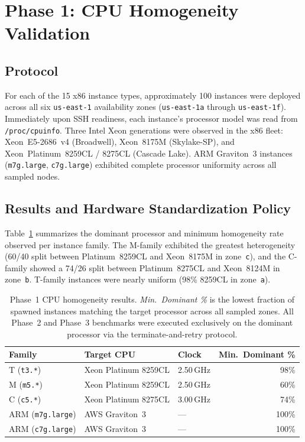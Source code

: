 \documentclass[conference]{IEEEtran}
\begin{document}
\section{Phase 1: CPU Homogeneity Validation}
\label{app:phase1}

\subsection{Protocol}

For each of the 15 x86 instance types, approximately 100 instances were deployed
across all six \texttt{us-east-1} availability zones (\texttt{us-east-1a}
through \texttt{us-east-1f}). Immediately upon SSH readiness, each instance's
processor model was read from \texttt{/proc/cpuinfo}. Three Intel Xeon
generations were observed in the x86 fleet: Xeon~E5-2686~v4 (Broadwell),
Xeon~8175M (Skylake-SP), and Xeon~Platinum~8259CL / 8275CL (Cascade Lake).
ARM Graviton~3 instances (\texttt{m7g.large}, \texttt{c7g.large}) exhibited
complete processor uniformity across all sampled nodes.

\subsection{Results and Hardware Standardization Policy}

Table~\ref{tab:app_cpu_homogeneity} summarizes the dominant processor and
minimum homogeneity rate observed per instance family. The M-family exhibited
the greatest heterogeneity (60/40 split between Platinum~8259CL and Xeon~8175M
in zone~\texttt{c}), and the C-family showed a 74/26 split between
Platinum~8275CL and Xeon~8124M in zone~\texttt{b}. T-family instances were
nearly uniform (98\% 8259CL in zone~\texttt{a}).

\begin{table}[!htbp]
\centering
\caption{Phase~1 CPU homogeneity results. \emph{Min.\ Dominant \%} is the
lowest fraction of spawned instances matching the target processor across all
sampled zones. All Phase~2 and Phase~3 benchmarks were executed exclusively on
the dominant processor via the terminate-and-retry protocol.}
\label{tab:app_cpu_homogeneity}
\small
\begin{tabular}{lllr}
\toprule
\textbf{Family} & \textbf{Target CPU} & \textbf{Clock} & \textbf{Min.\ Dominant \%} \\
\midrule
T (\texttt{t3.*}) & Xeon Platinum 8259CL & 2.50\,GHz & 98\% \\
M (\texttt{m5.*}) & Xeon Platinum 8259CL & 2.50\,GHz & 60\% \\
C (\texttt{c5.*}) & Xeon Platinum 8275CL & 3.00\,GHz & 74\% \\
ARM (\texttt{m7g.large}) & AWS Graviton~3      & ---       & 100\% \\
ARM (\texttt{c7g.large}) & AWS Graviton~3      & ---       & 100\% \\
\bottomrule
\end{tabular}
\end{table}
\end{document}
